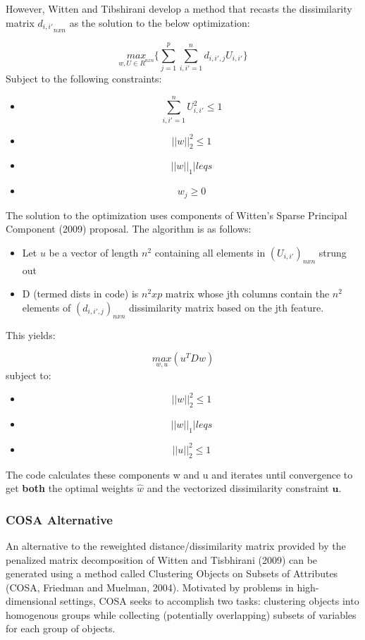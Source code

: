 \documentclass[
]{article}
\providecommand{\tightlist}{%
  \setlength{\itemsep}{0pt}\setlength{\parskip}{0pt}}
\begin{document}
However, Witten and Tibshirani develop a method that recasts the
dissimilarity matrix \({d_{i,i'}}_{nxn}\) as the solution to the below
optimization:

\[\underset{w, U \in R^{nxn}}{max} \{\sum_{j = 1}^{p}\sum_{i,i'=1}^{n} d_{i,i',j}U_{i,i'}\} \]
Subject to the following constraints:

\begin{itemize}
\tightlist
\item
  \[ \sum_{i,i'=1}^{n} U^2_{i,i'} \leq 1\]
\item
  \[ ||w||_2^2 \leq 1 \]
\item
  \[ ||w||_1 |leq s\]
\item
  \[ w_j \geq 0\]
\end{itemize}

The solution to the optimization uses components of Witten's Sparse
Principal Component (2009) proposal. The algorithm is as follows:

\begin{itemize}
\tightlist
\item
  Let \(u\) be a vector of length \(n^2\) containing all elements in
  \((U_{i,i'})_{nxn}\) strung out
\item
  D (termed dists in code) is \(n^2 x p\) matrix whose jth columns
  contain the \(n^2\) elements of \((d_{i,i',j})_{nxn}\) dissimilarity
  matrix based on the jth feature.
\end{itemize}

This yields:

\[ \underset{w,u}{max} (u^T Dw)\] subject to:

\begin{itemize}
\tightlist
\item
  \[ ||w||_2^2 \leq 1 \]
\item
  \[ ||w||_1 |leq s\]
\item
  \[ ||u||^2_2 \leq 1\]
\end{itemize}

The code calculates these components w and u and iterates until
convergence to get \textbf{both} the optimal weights \(\hat{w}\) and the
vectorized dissimilarity constraint \(\boldsymbol{u}\).

\hypertarget{cosa-alternative}{%
\subsubsection{COSA Alternative}\label{cosa-alternative}}

An alternative to the reweighted distance/dissimilarity matrix provided
by the penalized matrix decomposition of Witten and Tisbhirani (2009)
can be generated using a method called Clustering Objects on Subsets of
Attributes (COSA, Friedman and Muelman, 2004). Motivated by problems in
high-dimensional settings, COSA seeks to accomplish two tasks:
clustering objects into homogenous groups while collecting (potentially
overlapping) subsets of variables for each group of objects.
\end{document}
